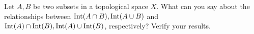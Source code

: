 \begin{comment}

\ExerciseSolution By definition, $\emptyset \in \tau$ and $\Z^+ = O_1$ is  in $\tau$. Let $\{U_{\alpha}\}_{\alpha \in I}$ be a collection of sets in $\tau$ for $\alpha$ in some indexing set $I$. If $U_{\alpha} = \emptyset$ for all $\alpha \in I$, then $\bigcup_{\alpha \in I} U_{\alpha} = \emptyset$ is in $\tau$. So assume there is at least one $\alpha \in I$ such that $U_{\alpha} \neq \emptyset$. Note that $O_{i+1} \subseteq O_i$ for each $i \in \Z^+$. Let $k \in \Z^+$ be the smallest integer such that $U_{\alpha} = O_k$ for some $\alpha \in I$. Then $\bigcup_{\alpha \in I} U_{\alpha} = O_k$ is in $\tau$. So $\tau$ is closed under arbitrary unions. 

Now suppose that $I$ is finite. If $U_{\alpha} = \emptyset$ for any $\alpha \in I$, then $\bigcap_{\alpha \in I} U_{\alpha} = \emptyset$, which is in $\tau$. So suppose no $U_{\alpha}$ is empty. Since $I$ is finite, there is a largest positive integer $k$ such that $U_{\alpha} = O_k$. Then $\bigcap_{\alpha \in I} U_{\alpha} = O_k$, which is in $\tau$. We conclude that $\tau$ is a topology on $\Z^+$. 

\end{comment}

\item Let $A, B$ be two subsets in a topological space $X$. What can you say about the relationships between $\text{Int}(A\cap B), \text{Int}(A\cup B)$ and $\text{Int}(A)\cap \text{Int}(B), \text{Int}(A)\cup \text{Int}(B)$, respectively? Verify your results.

\begin{comment}

\ExerciseSolution Let $X = \R$ with the standard topology, and let $A = (0,1]$ and $B = [1,2)$. Then $A \cup B = (0,2)$ and $\Int(A \cup B) = (0,2)$. However, $\Int(A) \cup \Int(B) = (0,1) \cup (1,2)$, so $\Int( A\cup B) \neq (\Int(A) \cup \Int(B))$. It is true, though, that $\Int(A) \cup \Int(B) \subseteq \Int(A \cup B)$. To see what, let $x \in \Int(A) \cup \Int(B)$. Then $x \in \Int(A)$ or $x \in \Int(B)$. Without loss of generality, assume that $x \in \Int(A)$. Then there is an open set $O$ in $A$ with $x \in O$. But $O \subseteq A$ implies $O \subseteq (A \cup B)$, so $x$ is also in $\Int(A \cup B)$. 

Finally, we will prove that $\Int(A)\cap \Int(B) = \Int(A \cap B)$. Let $x \in \Int(A) \cap \Int(B) $. Then $x \in \Int(A)$ and $x \in \Int(B)$. So there exist open sets $O_A$ in $A$ and $O_B$ in $B$ such that $x \in O_A$ and $x \in O_B$. From this we have that $O = O_A \cap O_B$ is an open set contained in $A \cap B$ and $x \in O$. Thus, $x \in \Int(A \cap B)$. So $\Int(A)\cap \Int(B) \subseteq  \Int(A \cap B)$.

Now suppose that $x \in \Int(A \cap B)$. Then there is an open set $O$ in $A \cap B$ with $x \in O$. But $O \subseteq A$ and $O \subseteq B$, so $x \in \Int(A)$ and $x \in \Int(B)$. It follows that $x \in \Int(A) \cap \Int(B)$. So $\Int(A \cap B) \subseteq  \Int(A)\cap \Int(B)$. These two inclusions show that  $\Int(A \cap B) = \Int(A)\cap \Int(B)$.

\end{comment}
 

